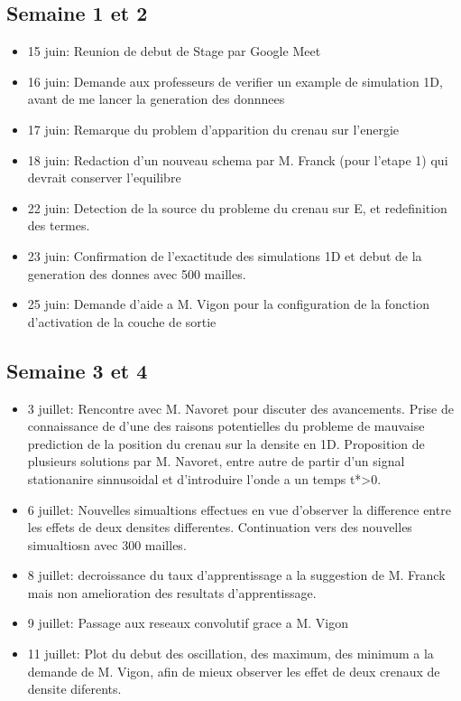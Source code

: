 \subsection{Semaine 1 et 2}
\begin{itemize}
 \item 15 juin: Reunion de debut de Stage par Google Meet
 \item 16 juin: Demande aux professeurs de verifier un example de simulation 1D, avant de me lancer la generation des donnnees
 \item 17 juin: Remarque du problem d'apparition du crenau sur l'energie 
 \item 18 juin: Redaction d'un nouveau schema par M. Franck (pour l'etape 1) qui devrait conserver l'equilibre
 \item 22 juin: Detection de la source du probleme du crenau sur E, et redefinition des termes. 
 \item 23 juin: Confirmation de l'exactitude des simulations 1D et debut de la generation des donnes avec 500 mailles.
\item 25 juin: Demande d'aide a M. Vigon pour la configuration de la fonction d'activation de la couche de sortie
\end{itemize}


\subsection{Semaine 3 et 4}

\begin{itemize}
 \item 3 juillet: Rencontre avec M. Navoret pour discuter des avancements. Prise de connaissance de d'une des raisons potentielles du probleme de mauvaise prediction de la position du crenau sur la densite en 1D. Proposition de plusieurs solutions par M. Navoret, entre autre de partir d'un signal stationanire sinnusoidal et d'introduire l'onde a un temps t*>0.
 \item 6 juillet: Nouvelles simualtions effectues en vue d'observer la difference entre les effets de deux densites differentes. Continuation vers des nouvelles simualtiosn avec 300 mailles.
 \item 8 juillet: decroissance du taux d'apprentissage a la suggestion de M. Franck mais non amelioration des resultats d'apprentissage.
 \item 9 juillet: Passage aux reseaux convolutif grace a M. Vigon
 \item 11 juillet: Plot du debut des oscillation, des maximum, des minimum a la demande de M. Vigon, afin de mieux observer les effet de deux crenaux de densite diferents. 
\end{itemize}

